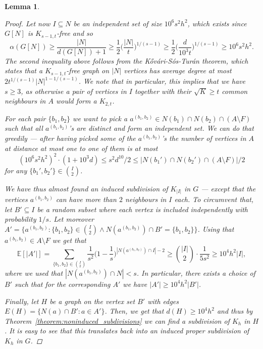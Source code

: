 \documentclass[10pt, a4paper]{article}
\numberwithin{theorem}{section} %
\newtheorem{lemma}[theorem]{Lemma}
\theoremstyle{remark}
\theoremstyle{definition}
\begin{document}
\begin{lemma}
\begin{proof}
        Let now $I \subseteq N$ be an independent set of size $10^6s^2h^2$, which exists since $G[N]$ is $K_{s-1, t}$-free and so
        \[
            \alpha(G[N]) \geq \frac{|N|}{d(G[N])+1}\geq \frac{1}{2}\Big(\frac{|N|}{t}\Big)^{1/(s-1)} \geq \frac{1}{2}\Big(\frac{d}{10^3t}\Big)^{1/(s-1)} \geq 10^6s^2h^2.
        \]
        The second inequality above follows from the K\H{o}v\'ari-S\'os-Tur\'an theorem, which states that a $K_{s-1,t}$-free graph on $|N|$ vertices has average degree at most $2t^{1/(s-1)}|N|^{1-1/(s-1)}$.
        We note that in particular, this implies that we have $s \geq 3$, as otherwise a pair of vertices in $I$ together with their $\sqrt{K}\geq t$ common neighbours in $A$ would form a $K_{2,t}$.

        For each pair $\{b_1, b_2\}$ we want to pick a  $a^{(b_1, b_2)} \in N(b_1) \cap N(b_2) \cap (A\setminus F)$ such that all $a^{(b_1, b_2)}$'s are distinct and form an independent set.
        We can do that greedily --- after having picked some of the $a^{(b_1, b_2)}$'s the number of vertices in $A$ at distance at most one to one of them is at most
        \[
            (10^6 s^2 h^2)^2 \cdot (1 + 10^3d) \leq s^2d^{10}/2 \leq |N(b_1') \cap N(b_2') \cap (A \setminus F)|/2 
        \]
        for any $\{b_1', b_2'\} \in \binom{I}{2}$.

        We have thus almost found an induced subdivision of $K_{|I|}$ in $G$ --- except that the vertices $a^{(b_1, b_2)}$ can have more than $2$ neighbours in $I$ each.
        To circumvent that, let $B' \subseteq I$ be a random subset where each vertex is included independently with probability $1/s$.
        Let moreover $A' = \{ a^{(b_1, b_2)} : \{b_1, b_2\} \in \binom{I}{2} \wedge N(a^{(b_1, b_2)})\cap B' = \{b_1, b_2\}\}$.
        Using that $a^{(b_1, b_2)} \in A \setminus F$ we get that
        \[
            \mathbb{E}[|A'|] = \sum_{\{b_1, b_2\} \in \binom{I}{2}} \frac{1}{s^2}\Big(1 - \frac{1}{s}\Big)^{|N(a^{(b_1, b_2)}) \cap I| -2} \geq \binom{|I|}{2} \cdot \frac{1}{5s^2} \geq 10^4h^2 |I|,
	        \]
            where we used that $|N(a^{(b_1,b_2)})\cap N|<s$.
	        In particular, there exists a choice of $B'$ such that for the corresponding $A'$ we have $|A'| \geq 10^4h^2 |B'|$. 

        Finally, let $H$ be a graph on the vertex set $B'$ with edges $E(H) = \{ N(a) \cap B' : a\in A' \}$.
        Then, we get that $d(H) \geq 10^4h^2$ and thus by Theorem~\ref{theorem:noninduced_subdivisions} we can find a subdivision of $K_h$ in $H$.
        It is easy to see that this translates back into an induced proper subdivision of $K_h$ in $G$.


\end{proof}
\end{lemma}
\end{document}
